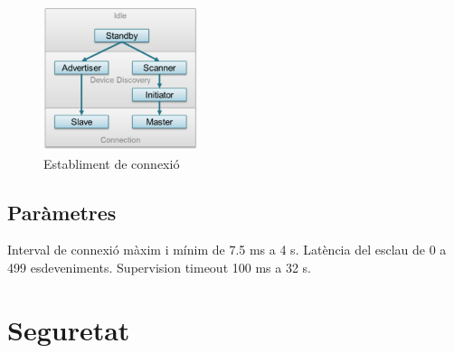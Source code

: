 \begin{figure}[h]
	\begin{center}
		\includegraphics[width=0.4\textwidth]{./images/gap_state_diagram.png}
		\caption{Establiment de connexió}
	\end{center}
\end{figure}


\subsection{Paràmetres}
Interval de connexió màxim i mínim de 7.5 ms a 4 s.
Latència del esclau de 0 a 499 esdeveniments.
Supervision timeout 100 ms a 32 s.

\section{Seguretat}